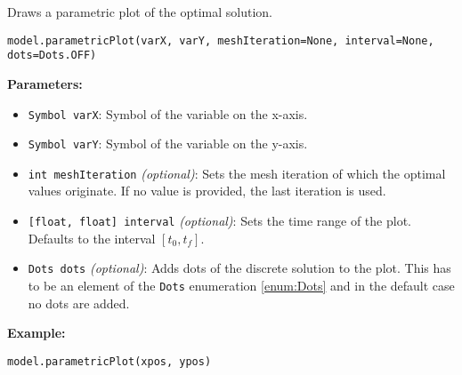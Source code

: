 \documentclass[12pt]{article}
\begin{document}
\begin{mdframed}[backgroundcolor=gray!10, roundcorner=10pt,
		linewidth=1pt]

	Draws a parametric plot of the optimal solution.

	\begin{lstlisting}
model.parametricPlot(varX, varY, meshIteration=None, interval=None, dots=Dots.OFF)
		\end{lstlisting}
	\label{parametricPlot}
	\textbf{Parameters:}
	\begin{itemize}
		\item \texttt{Symbol varX}: Symbol of the variable on the
		      x-axis.

		\item \texttt{Symbol varY}: Symbol of the variable on the
		      y-axis.

		\item \texttt{int meshIteration} \emph{(optional)}: Sets the
		      mesh iteration of which the optimal values originate. If no value is provided,
		      the last iteration is used.

		\item \texttt{[float, float] interval} \emph{(optional)}: Sets
		      the time range of the plot. Defaults to the interval $[t_0, t_f]$.

		\item \texttt{Dots dots} \emph{(optional)}: Adds dots of the
		      discrete solution to the plot. This has to be an element of the \texttt{Dots}
		      enumeration \eqref{enum:Dots} and in the default case no dots are added.
	\end{itemize}

	\textbf{Example:}
	\begin{lstlisting}
model.parametricPlot(xpos, ypos)   
\end{lstlisting}
\end{mdframed}
\end{document}
